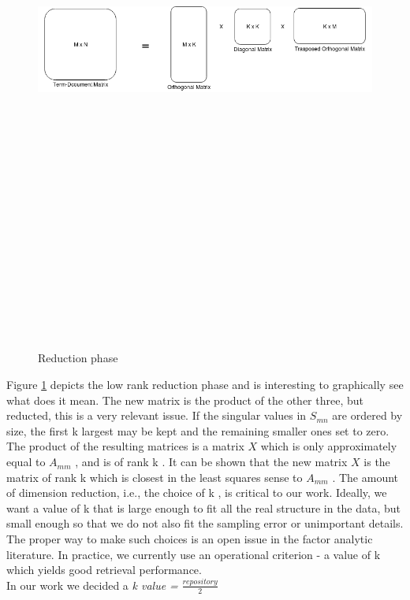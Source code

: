 \begin{figure}[h!]
	\centering
	\includegraphics[width=15cm,height=20cm,keepaspectratio]{images/LSIk.png}
	\caption{Reduction phase}
	\label{fig:LSIk}
\end{figure}

Figure \ref{fig:LSIk} depicts the low rank reduction phase and is interesting to graphically see what does it mean. The new matrix is the product of the other three, but reducted, this is a very relevant issue. If the singular values in $S_{mn}$ are ordered by size, the first k largest may be kept and the remaining smaller ones set to zero. The product of the resulting matrices is a matrix $X$ which is only approximately equal to $A_{mm}$ , and is of rank k . It can be shown that the new matrix $X$ is the matrix of rank k which is closest in the least squares sense to $A_{mm}$ .
The amount of dimension reduction, i.e., the choice of k , is critical to our work. Ideally, we want a value of k that is large enough to fit all the real structure in the data, but small enough so that we do not also fit the sampling error or unimportant details. The proper way to make such choices is an open issue in the factor analytic literature. In practice, we currently use an operational criterion - a value of k which yields good retrieval performance.\\ In our work we decided a \emph{k value =} $\frac{repository}{2}$

